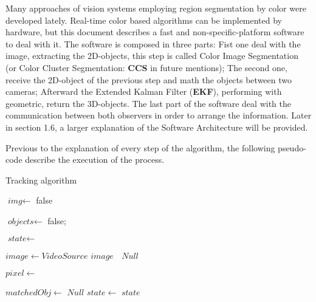 Many approaches of vision systems employing region segmentation \cite{fast_segmentation_Mitra} \cite{fuzzy_segmentation} by color were developed lately. Real-time color based algorithms can be implemented by hardware, but this document describes a fast and non-specific-platform software to deal with it. The software is composed in three parts: Fist one deal with the image, extracting the 2D-objects, this step is called Color Image Segmentation \cite{JamesBruce_CMU_SEG} (or Color Cluster Segmentation: \textbf{CCS} in future mentions); The second one, receive the 2D-object of the previous step and math the objects between two cameras; Afterward the Extended Kalman Filter \cite{GabrielTerejanu_EKF} (\textbf{EKF}), performing with geometric, return the 3D-objects. The last part of the software deal with the communication between both observers in order to arrange the information. Later in section 1.6, a larger explanation of the Software Architecture will be provided.

Previous to the explanation of every step of the algorithm, the following pseudo-code describe the execution of the process.

\begin{algorithm}[hp]
\caption{Tracking algorithm}\label{algorithm_pseudo}
	\begin{algorithmic}[1]
		\State {}
		\State {}
		\State $\textit{img}  \gets$ 
			\State \Return false
		\EndIf
		
		\State $\textit{objects} \gets$ 
			\State \Return false;
		\EndIf
		
		\State $\textit{state} \gets$ 
	\EndProcedure
	
			\State $image \gets VideoSource$
			\Return $image$
		\Else $\;$
			\State \Return $Null$
		\EndIf
		
	\EndProcedure
	
			\State {}
		\EndIf
			\State $pixel \gets$ 
		\EndFor
			\State \Return {}
	\EndProcedure
	
		\State $matchedObj \gets$  
			\State \Return $Null$
		\EndIf
		\State $state \gets$ 
		\State \Return $state$
	\EndProcedure
	
	\end{algorithmic}
\end{algorithm}